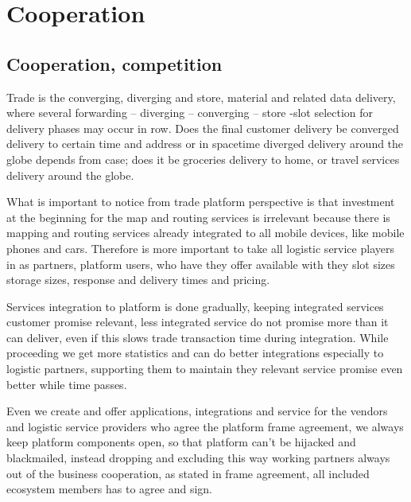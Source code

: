 %
%
%
\part{Cooperation}\label{cooperation}
\chapter{Cooperation, competition}\label{cooperation_competition}

Trade is the converging, diverging and store, material and related data
delivery, where several forwarding -- diverging -- converging
-- store -slot selection for delivery phases may occur in row. Does
the final customer delivery be converged delivery to certain time and address
or in spacetime diverged delivery around the globe depends from case; does it
be groceries delivery to home, or travel services delivery around the globe.

What is important to notice from trade platform perspective is that investment
at the beginning for the map and routing services is irrelevant because there
is mapping and routing services already integrated to all mobile devices, like
mobile phones and cars. Therefore is more important to take all logistic
service players in as partners, platform users, who have they offer available
with they slot sizes storage sizes, response and delivery times and pricing.

Services integration to platform is done gradually, keeping integrated
services customer promise relevant, less integrated service do not promise
more than it can deliver, even if this slows trade transaction time during
integration. While proceeding we get more statistics and can do better
integrations especially to logistic partners, supporting them to maintain
they relevant service promise even better while time passes.

Even we create and offer applications, integrations and service for the
vendors and logistic service providers who agree the platform frame agreement,
we always keep platform components open, so that platform can't be hijacked
and blackmailed, instead dropping and excluding this way working partners
always out of the business cooperation, as stated in frame agreement, all
included ecosystem members has to agree and sign.

